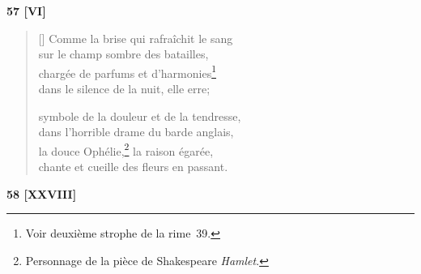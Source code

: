\documentclass[a4paper,12pt]{book}
\begin{document}
\bigskip

\begin{center}
  \textbf{57 [VI]}
\end{center}

\settowidth{\versewidth}{chante et cueille des fleurs en passant.}

\begin{verse}[\versewidth]
  Comme la brise qui rafraîchit le sang \\
  sur le champ sombre des batailles, \\
  chargée de parfums et d'harmonies\footnote{Voir deuxième strophe de
  la rime~39.} \\
  dans le silence de la nuit, elle erre;

  symbole de la douleur et de la tendresse, \\
  dans l'horrible drame du barde anglais, \\
  la douce Ophélie,\footnote{Personnage de la pièce de Shakespeare
  \emph{Hamlet}.} la  raison égarée, \\
  chante et cueille des fleurs en passant.
\end{verse}

\bigskip

\begin{center}
  \textbf{58 [XXVIII]}
\end{center}

\settowidth{\versewidth}{dis-moi: est-ce que je touche et respire}
\end{document}
